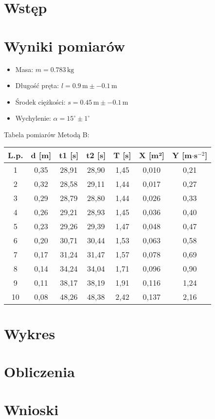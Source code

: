 \documentclass[12pt]{article}
\begin{document}
\section*{Wstęp}

\section*{Wyniki pomiarów}

\begin{itemize}
    \item Masa: \( m = 0.783 \, \text{kg} \)
    \item Długość pręta: \( l = 0.9 \, \text{m} \pm -0.1 \, \text{m} \)
    \item Środek ciężkości: \( s = 0.45 \, \text{m} \pm -0.1 \, \text{m} \)
    \item Wychylenie: \( \alpha = 15^\circ \pm 1^\circ \)
\end{itemize}

Tabela pomiarów Metodą B:

\begin{center}
    \begin{tabular}{|c|c|c|c|c|c|c|}
    \hline
    L.p. & d [m] & t1 [s] & t2 [s] & T [s] & X [m²] & Y [m$\cdot$s$^{-2}$] \\
    \hline
    1 & 0{,}35 & 28{,}91 & 28{,}90 & 1{,}45 & 0{,}010 & 0{,}21 \\
    2 & 0{,}32 & 28{,}58 & 29{,}11 & 1{,}44 & 0{,}017 & 0{,}27 \\
    3 & 0{,}29 & 28{,}79 & 28{,}80 & 1{,}44 & 0{,}026 & 0{,}33 \\
    4 & 0{,}26 & 29{,}21 & 28{,}93 & 1{,}45 & 0{,}036 & 0{,}40 \\
    5 & 0{,}23 & 29{,}26 & 29{,}39 & 1{,}47 & 0{,}048 & 0{,}47 \\
    6 & 0{,}20 & 30{,}71 & 30{,}44 & 1{,}53 & 0{,}063 & 0{,}58 \\
    7 & 0{,}17 & 31{,}24 & 31{,}47 & 1{,}57 & 0{,}078 & 0{,}69 \\
    8 & 0{,}14 & 34{,}24 & 34{,}04 & 1{,}71 & 0{,}096 & 0{,}90 \\
    9 & 0{,}11 & 38{,}17 & 38{,}19 & 1{,}91 & 0{,}116 & 1{,}24 \\
    10 & 0{,}08 & 48{,}26 & 48{,}38 & 2{,}42 & 0{,}137 & 2{,}16 \\
    \hline
    \end{tabular}
    \end{center}
    
\section*{Wykres}
\section*{Obliczenia}
\section*{Wnioski}
\end{document}
